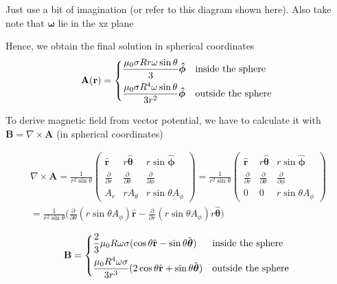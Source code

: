 \documentclass[12pt,a4paper]{extreport}
\numberwithin{equation}{chapter}
\let\oldhat\hat
\renewcommand{\hat}[1]{\oldhat{\mathbf{#1}}}
\begin{document}
    Just use a bit of imagination (or refer to this diagram shown here). Also take note that $\boldsymbol{\omega}$ lie in the xz plane

    Hence, we obtain the final solution in spherical coordinates
    $$\mathbf{A(r)} =
    \begin{dcases*}
    \frac{\mu_0\sigma Rr \omega \sin \theta}{3}\boldsymbol{\hat{\phi}} & \text{inside the sphere}\\
    \frac{\mu_0\sigma R^4 \omega \sin \theta}{3 r^2}\boldsymbol{\hat{\phi}} & \text{outside the sphere}
    \end{dcases*}$$

    To derive magnetic field from vector potential, we have to calculate it with $\mathbf{B}=\nabla \times \mathbf{A}$ (in spherical coordinates)

    \begin{multline}
        \nabla \times \mathbf{A}=\frac{1}{r^2 \sin\theta}
        \begin{pmatrix}
            \hat{r} & r\hat{\boldsymbol{\theta}} & r\sin\hat{\boldsymbol{\phi}}\\
            \frac{\partial}{\partial r} & \frac{\partial}{\partial\theta} & \frac{\partial}{\partial\phi} \\
            A_r & rA_\theta & r\sin\theta A_\phi
        \end{pmatrix}
        =\frac{1}{r^2 \sin\theta}\begin{pmatrix}
            \hat{r} & r\hat{\theta} & r\sin\hat{\phi}\\
            \frac{\partial}{\partial r} & \frac{\partial}{\partial\theta} & \frac{\partial}{\partial\phi} \\
            0 & 0 & r\sin\theta A_\phi
        \end{pmatrix}
        \\=\frac{1}{r^2 \sin\theta}\bigg(\frac{\partial}{\partial \theta} (r\sin\theta A_\phi)\hat{r}-\frac{\partial}{\partial r} (r\sin\theta A_\phi)r\hat{\boldsymbol{\theta}}\bigg)
    \end{multline}

    \begin{equation}
    \mathbf{B} =
    \begin{dcases*}
        \frac{2}{3}\mu_0 R \omega \sigma (\cos\theta \hat{r}-\sin \theta \hat{\boldsymbol{\theta}}) & \text{inside the sphere}  \\
        \frac{\mu_0 R^4 \omega \sigma}{3r^3} (2\cos\theta \hat{r}+\sin \theta \hat{\boldsymbol{\theta}}) & \text{outside the sphere}
    \end{dcases*}
    \end{equation}
\end{document}
